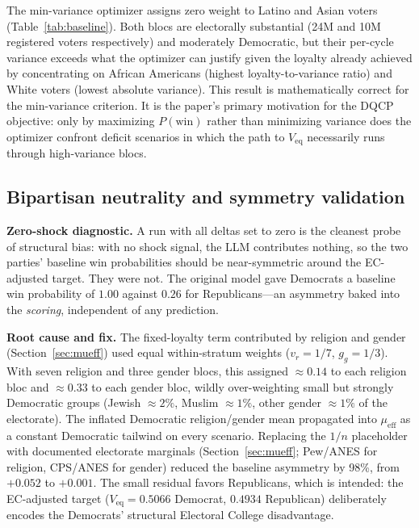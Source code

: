 \documentclass[12pt, letterpaper]{article}
\theoremstyle{definition}
\newcommand{\mueff}{\mu_{\mathrm{eff}}}
\newcommand{\Veq}{V_{\mathrm{eq}}}
\begin{document}
The min-variance optimizer assigns zero weight to Latino and Asian voters
(Table~\ref{tab:baseline}). Both blocs are electorally substantial (24M and
10M registered voters respectively) and moderately Democratic, but their
per-cycle variance exceeds what the optimizer can justify given the loyalty
already achieved by concentrating on African Americans (highest loyalty-to-variance
ratio) and White voters (lowest absolute variance). This result is mathematically
correct for the min-variance criterion. It is the paper's primary motivation for
the DQCP objective: only by maximizing $P(\text{win})$ rather than minimizing
variance does the optimizer confront deficit scenarios in which the path to
$\Veq$ necessarily runs through high-variance blocs.

\subsection{Bipartisan neutrality and symmetry validation}
\label{sec:symmetry_results}

\textbf{Zero-shock diagnostic.} A run with all deltas set to zero is the cleanest
probe of structural bias: with no shock signal, the LLM contributes nothing, so the
two parties' baseline win probabilities should be near-symmetric around the
EC-adjusted target. They were not. The original model gave Democrats a baseline win
probability of $1.00$ against $0.26$ for Republicans---an asymmetry baked into the
\emph{scoring}, independent of any prediction.

\textbf{Root cause and fix.} The fixed-loyalty term contributed by religion and gender
(Section~\ref{sec:mueff}) used equal within-stratum weights ($v_r = 1/7$, $g_g = 1/3$).
With seven religion and three gender blocs, this assigned $\approx 0.14$ to each
religion bloc and $\approx 0.33$ to each gender bloc, wildly over-weighting small but
strongly Democratic groups (Jewish $\approx 2\%$, Muslim $\approx 1\%$, other gender
$\approx 1\%$ of the electorate). The inflated Democratic religion/gender mean
propagated into $\mueff$ as a constant Democratic tailwind on every scenario. Replacing
the $1/n$ placeholder with documented electorate marginals
(Section~\ref{sec:mueff}; Pew/ANES for religion, CPS/ANES for gender) reduced the
baseline asymmetry by 98\%, from $+0.052$ to $+0.001$. The small residual favors
Republicans, which is intended: the EC-adjusted target
($\Veq = 0.5066$ Democrat, $0.4934$ Republican) deliberately encodes the Democrats'
structural Electoral College disadvantage.
\end{document}
